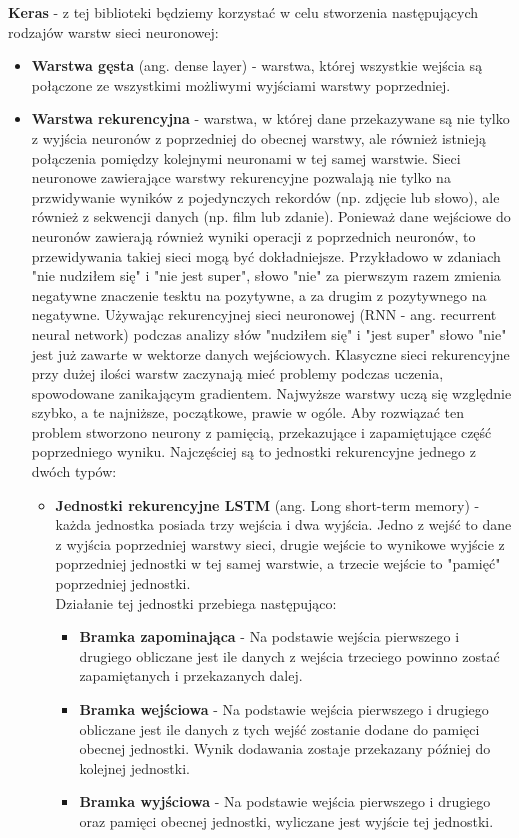 \documentclass[11pt, a4paper, notitlepage]{report}
\begin{document}
{\bf Keras} - z tej biblioteki będziemy korzystać w celu stworzenia następujących rodzajów warstw sieci neuronowej:

\begin{itemize}
    \item {\bf Warstwa gęsta} (ang. dense layer) - warstwa, której wszystkie wejścia są połączone ze wszystkimi możliwymi wyjściami warstwy poprzedniej.
    \item {\bf Warstwa rekurencyjna} - warstwa, w której dane przekazywane są nie tylko z wyjścia neuronów z poprzedniej do obecnej warstwy, ale również istnieją połączenia pomiędzy kolejnymi neuronami w tej samej warstwie. Sieci neuronowe zawierające warstwy rekurencyjne pozwalają nie tylko na przwidywanie wyników z pojedynczych rekordów (np. zdjęcie lub słowo), ale również z sekwencji danych (np. film lub zdanie). Ponieważ dane wejściowe do neuronów zawierają również wyniki operacji z poprzednich neuronów, to przewidywania takiej sieci mogą być dokładniejsze. Przykładowo w zdaniach "nie nudziłem się" i "nie jest super", słowo "nie" za pierwszym razem zmienia negatywne znaczenie tesktu na pozytywne, a za drugim z pozytywnego na negatywne. Używając rekurencyjnej sieci neuronowej (RNN - ang. recurrent neural network) podczas analizy słów "nudziłem się" i "jest super" słowo "nie" jest już zawarte w wektorze danych wejściowych. Klasyczne sieci rekurencyjne przy dużej ilości warstw zaczynają mieć problemy podczas uczenia, spowodowane zanikającym gradientem. Najwyższe warstwy uczą się względnie szybko, a te najniższe, początkowe, prawie w ogóle. Aby rozwiązać ten problem stworzono neurony z pamięcią, przekazujące i zapamiętujące część poprzedniego wyniku. Najczęściej są to jednostki rekurencyjne jednego z dwóch typów:
    \begin{itemize}
            \item {\bf Jednostki rekurencyjne LSTM} (ang. Long short-term memory) - każda jednostka posiada trzy wejścia i dwa wyjścia. Jedno z wejść to dane z wyjścia poprzedniej warstwy sieci, drugie wejście to wynikowe wyjście z poprzedniej jednostki w tej samej warstwie, a trzecie wejście to "pamięć" poprzedniej jednostki.\\
        Działanie tej jednostki przebiega następująco:
        \begin{itemize}
            \item {\bf Bramka zapominająca} - Na podstawie wejścia pierwszego i drugiego obliczane jest ile danych z wejścia trzeciego powinno zostać zapamiętanych i przekazanych dalej.
            \item {\bf Bramka wejściowa} - Na podstawie wejścia pierwszego i drugiego obliczane jest ile danych z tych wejść zostanie dodane do pamięci obecnej jednostki. Wynik dodawania zostaje przekazany później do kolejnej jednostki.
            \item {\bf Bramka wyjściowa} - Na podstawie wejścia pierwszego i drugiego oraz pamięci obecnej jednostki, wyliczane jest wyjście tej jednostki.
        \end{itemize}


\end{itemize}
\end{itemize}
\end{document}
